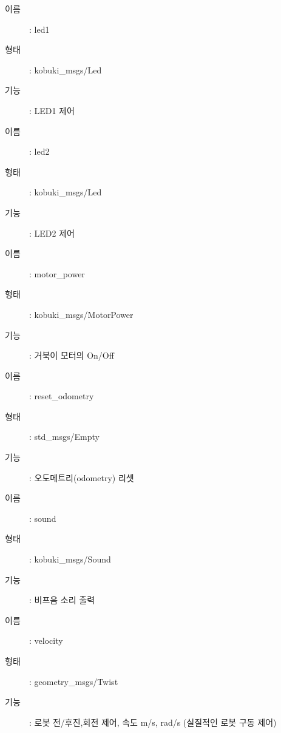 \vspace{\baselineskip}
\begin{description}
\item[이름]: led1
\item[형태]: kobuki\_msgs/Led
\item[기능]: LED1 제어
\end{description}

\vspace{\baselineskip}
\begin{description}
\item[이름]: led2
\item[형태]: kobuki\_msgs/Led
\item[기능]: LED2 제어
\end{description}

\vspace{\baselineskip}
\begin{description}
\item[이름]: motor\_power
\item[형태]: kobuki\_msgs/MotorPower
\item[기능]: 거북이 모터의 On/Off
\end{description}

\vspace{\baselineskip}
\begin{description}
\item[이름]: reset\_odometry
\item[형태]: std\_msgs/Empty
\item[기능]: 오도메트리(odometry) 리셋
\end{description}

\vspace{\baselineskip}
\begin{description}
\item[이름]: sound
\item[형태]: kobuki\_msgs/Sound
\item[기능]: 비프음 소리 출력
\end{description}

\vspace{\baselineskip}
\begin{description}
\item[이름]: velocity
\item[형태]: geometry\_msgs/Twist
\item[기능]: 로봇 전/후진,회전 제어, 속도 m/s, rad/s (실질적인 로봇 구동 제어)
\end{description}

